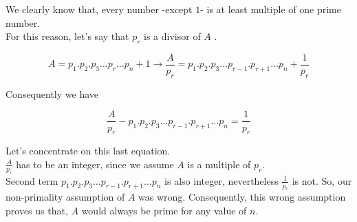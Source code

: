 \documentclass[11pt]{article}
\begin{document}
We clearly know that, every number -except $1$- is at least multiple of one prime number. \\

For this reason, let's say that $p_r$ is a divisor of $A$ . 

\begin{equation}
 A = p_1.p_2.p_3 \dots p_r \dots p_n + 1 \rightarrow \frac{A}{p_r} = p_1.p_2.p_3 \dots p_{r-1}.p_{r+1} \dots p_n + \frac{1}{p_r}
\end{equation}

Consequently we have 

\begin{equation}
\frac{A}{p_r} - p_1.p_2.p_3 \dots p_{r-1}.p_{r+1} \dots p_n = \frac{1}{p_r} 
\end{equation}

Let's concentrate on this last equation. \\

$\frac{A}{p_r}$ has to be an integer, since we assume $A$ is a multiple of $p_r$. \\

Second term $p_1.p_2.p_3 \dots p_{r-1}.p_{r+1} \dots p_n$ is also integer, nevertheless $\frac{1}{p_r}$ is not. 
So, our non-primality assumption of $A$ was wrong. Consequently, this wrong assumption proves us that, $A$ would always be prime for any value of $n$.
\end{document}
